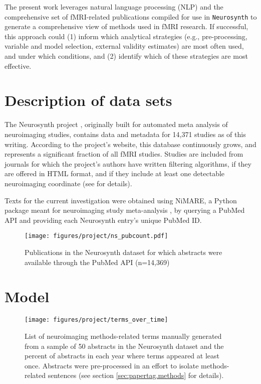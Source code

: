 The present work leverages natural language processing (NLP) and the comprehensive set of fMRI-related publications compiled for use in \texttt{Neurosynth} \cite{YarkoniEtAl2011} to generate a comprehensive view of methods used in fMRI research. If successful, this approach could (1) inform which analytical strategies (e.g., pre-processing, variable and model selection, external validity estimates) are most often used, and under which conditions, and (2) identify which of these strategies are most effective. 


\section{Description of data sets}
\label{sec:papertag.data}


The Neurosynth project \cite{YarkoniEtAl2011}, originally built for automated meta analysis of neuroimaging studies, contains data and metadata for 14,371 studies as of this writing. According to the project's website, this database continuously grows, and represents a significant fraction of all fMRI studies. Studies are included from journals for which the project's authors have written filtering algorithms, if they are offered in HTML format, and if they include at least one detectable neuroimaging coordinate (see \cite{YarkoniEtAl2011} for details). 

Texts for the current investigation were obtained using NiMARE, a Python package meant for neuroimaging study meta-analysis \cite{SaloEtAl2022, SaloEtAl2023}, by querying a PubMed API and providing each Neurosynth entry's unique PubMed ID. 

\begin{figure}[!tp]
	\centering
	\texttt{[image: figures/project/ns\_pubcount.pdf]}
	\caption{Publications in the Neurosynth dataset for which abstracts were available through the PubMed API (n=14,369)}
	\label{fig:papertag.pubcounts}
	\end{figure}


\section{Model}
\label{sec:papertag.model}


\begin{figure}[tp!]
	\centering
	\texttt{[image: figures/project/terms\_over\_time]}
	\caption{List of neuroimaging methods-related terms manually generated from a sample of 50 abstracts in the Neurosynth dataset and the percent of abstracts in each year where terms appeared at least once. Abstracts were pre-processed in an effort to isolate methods-related sentences (see section \ref{sec:papertag.methods} for details).}
	\label{fig:papertag.corpus}
\end{figure}

